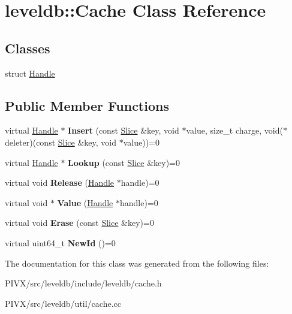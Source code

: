 \hypertarget{classleveldb_1_1_cache}{}\section{leveldb\+:\+:Cache Class Reference}
\label{classleveldb_1_1_cache}
\subsection*{Classes}
\begin{DoxyCompactItemize}
\item 
struct \mbox{\hyperlink{structleveldb_1_1_cache_1_1_handle}{Handle}}
\end{DoxyCompactItemize}
\subsection*{Public Member Functions}
\begin{DoxyCompactItemize}
\item 
\mbox{\label{classleveldb_1_1_cache_af0b55b7fa0e64184fa62e0dbe9ba9eae}} 
virtual \mbox{\hyperlink{structleveldb_1_1_cache_1_1_handle}{Handle}} $\ast$ {\bfseries Insert} (const \mbox{\hyperlink{classleveldb_1_1_slice}{Slice}} \&key, void $\ast$value, size\+\_\+t charge, void($\ast$deleter)(const \mbox{\hyperlink{classleveldb_1_1_slice}{Slice}} \&key, void $\ast$value))=0
\item 
\mbox{\label{classleveldb_1_1_cache_af90785205182a25cf741dc13a48d76cb}} 
virtual \mbox{\hyperlink{structleveldb_1_1_cache_1_1_handle}{Handle}} $\ast$ {\bfseries Lookup} (const \mbox{\hyperlink{classleveldb_1_1_slice}{Slice}} \&key)=0
\item 
\mbox{\label{classleveldb_1_1_cache_a712618c8bf3bfa48b7bab1fbc23c3002}} 
virtual void {\bfseries Release} (\mbox{\hyperlink{structleveldb_1_1_cache_1_1_handle}{Handle}} $\ast$handle)=0
\item 
\mbox{\label{classleveldb_1_1_cache_a454920df8e68917adcf011dfb3538661}} 
virtual void $\ast$ {\bfseries Value} (\mbox{\hyperlink{structleveldb_1_1_cache_1_1_handle}{Handle}} $\ast$handle)=0
\item 
\mbox{\label{classleveldb_1_1_cache_af833a38763598253338de37aba079db6}} 
virtual void {\bfseries Erase} (const \mbox{\hyperlink{classleveldb_1_1_slice}{Slice}} \&key)=0
\item 
\mbox{\label{classleveldb_1_1_cache_ae2d79bfe747fc6c165c77398cc31e125}} 
virtual uint64\+\_\+t {\bfseries New\+Id} ()=0
\end{DoxyCompactItemize}


The documentation for this class was generated from the following files\+:\begin{DoxyCompactItemize}
\item 
P\+I\+V\+X/src/leveldb/include/leveldb/cache.\+h\item 
P\+I\+V\+X/src/leveldb/util/cache.\+cc\end{DoxyCompactItemize}
